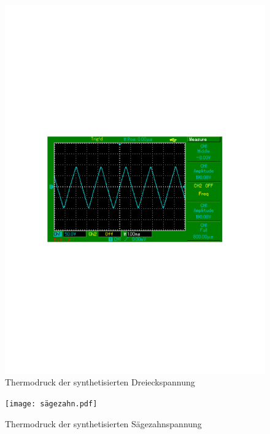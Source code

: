 
\begin{figure}[h!]
  \centering
  \includegraphics[width=\textwidth]{dreieck.pdf}
  \caption{Thermodruck der synthetisierten Dreieckspannung}
  \label{fig:dreieck}
\end{figure}


\begin{figure}[h!]
  \centering
  \texttt{[image: sägezahn.pdf]}
  \caption{Thermodruck der synthetisierten Sägezahnspannung}
  \label{fig:sägezahn}
\end{figure}
\newpage
